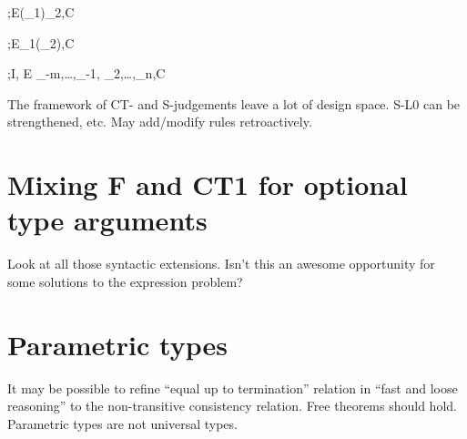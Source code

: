 \documentclass{amsart}
\begin{document}
{\Delta;E\vdash(\sigma_1)\le\sigma_2,C}

{\Delta;E\vdash\sigma_1\le(\All\alpha\sigma_2),C}


{\Delta;\alpha\in I,
E\vdash
\sigma_{-m}\le\alpha,\ldots,\sigma_{-1}\le\alpha,
\alpha\le\sigma_2,\ldots,\alpha\le\sigma_n,C
}





The framework of CT- and S-judgements leave a lot of design
space. S-L0 can be strengthened, etc. May add/modify rules
retroactively.


\section{Mixing F and CT1 for optional type arguments}

Look at all those syntactic extensions. Isn't this an awesome
opportunity for some solutions to the expression problem?


\section{Parametric types}

It may be possible to refine ``equal up to termination'' relation
in ``fast and loose reasoning'' to the non-transitive consistency
relation. Free theorems should hold. Parametric types are not
universal types.



\end{document}
